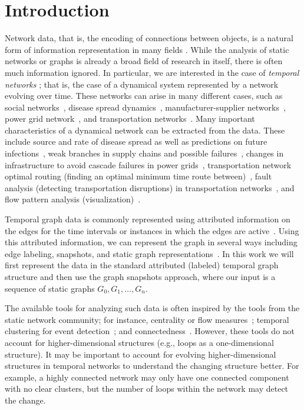 %
%
%
%

\section{Introduction} \label{sec:intro}

%
%

%
%

Network data, that is, the encoding of connections between objects, is a natural form of information representation in many fields \cite{Porter2020}.
While the analysis of static networks or graphs is already a broad field of research in itself, there is often much information ignored. 
In particular, we are interested in the case of \textit{temporal networks} \cite{Holme2013,Holme2015}; that is, the case of a dynamical system represented by a network evolving over time. 
These networks can arise in many different cases, such as 
social networks~\cite{Skyrms2000}, 
disease spread dynamics~\cite{Husein2019}, 
manufacturer-supplier networks~\cite{Xu2019b}, 
power grid network~\cite{Schaefer2018}, and
transportation networks~\cite{DavidBoyce2012}. 
%
Many important characteristics of a dynamical network can be extracted from the data. These include source and rate of disease spread as well as predictions on future infections~\cite{Enright2018}, weak branches in supply chains and possible failures~\cite{Nuss2016, Xu2019b}, changes in infrastructure to avoid cascade failures in power grids~\cite{Soltan2014, Schaefer2018}, transportation network optimal routing (finding an optimal minimum time route between)~\cite{Bast2015}, fault analysis (detecting transportation disruptions) in transportation networks~\cite{Sugishita2020}, and flow pattern analysis (visualization)~\cite{Hackl2019}.


Temporal graph data is commonly represented using attributed information on the edges for the time intervals or instances in which the edges are active~\cite{Chen2016a,Huang2015}. 
Using this attributed information, we can represent the graph in several ways including edge labeling, snapshots, and static graph representations~\cite{Wang2019}. 
In this work we will first represent the data in the standard attributed (labeled) temporal graph structure and then use the graph snapshots approach, where our input is a sequence of static graphs $G_0, G_1, \ldots, G_n$.


The available tools for analyzing such data is often inspired by the tools from the static network community; for instance, 
centrality or flow measures~\cite{Borgatti2005}; temporal clustering for event detection~\cite{Crawford2018, You2021, Moriano2019}; and connectedness~\cite{Kempe2002}. 
However, these tools do not account for higher-dimensional structures (e.g., loops as a one-dimensional structure). 
It may be important to account for evolving higher-dimensional structures in temporal networks to understand the changing structure better. For example, a highly connected network may only have one connected component with no clear clusters, but the number of loops within the network may detect the change.

